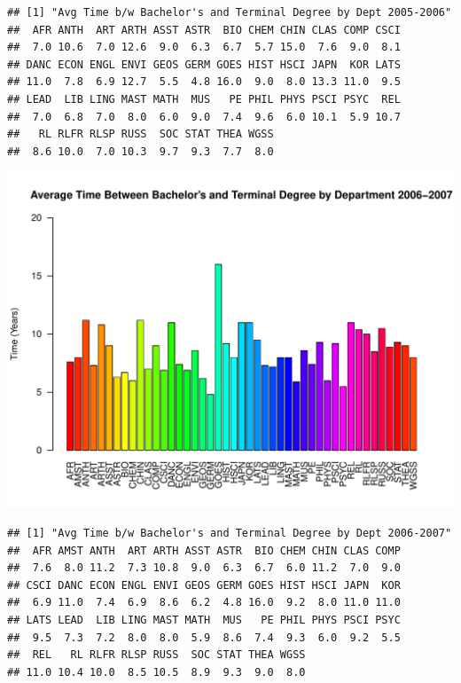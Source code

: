 \documentclass[12pt,a4paper]{article}\usepackage[]{graphicx}\usepackage[]{color}
\makeatletter
\def\maxwidth{ %
  \ifdim\Gin@nat@width>\linewidth
    \linewidth
  \else
    \Gin@nat@width
  \fi
}
\newenvironment{kframe}{%
 \def\at@end@of@kframe{}%
 \ifinner\ifhmode%
  \def\at@end@of@kframe{\end{minipage}}%
  \begin{minipage}{\columnwidth}%
 \fi\fi%
 \def\FrameCommand##1{\hskip\@totalleftmargin \hskip-\fboxsep
 \colorbox{shadecolor}{##1}\hskip-\fboxsep
     \hskip-\linewidth \hskip-\@totalleftmargin \hskip\columnwidth}%
 \MakeFramed {\advance\hsize-\width
   \@totalleftmargin\z@ \linewidth\hsize
   \@setminipage}}%
 {\par\unskip\endMakeFramed%
 \at@end@of@kframe}
\newenvironment{knitrout}{}{} %
\theoremstyle{definition}
\makeatother
\begin{document}
\begin{knitrout}
\begin{kframe}\begin{verbatim}
## [1] "Avg Time b/w Bachelor's and Terminal Degree by Dept 2005-2006"
##  AFR ANTH  ART ARTH ASST ASTR  BIO CHEM CHIN CLAS COMP CSCI 
##  7.0 10.6  7.0 12.6  9.0  6.3  6.7  5.7 15.0  7.6  9.0  8.1 
## DANC ECON ENGL ENVI GEOS GERM GOES HIST HSCI JAPN  KOR LATS 
## 11.0  7.8  6.9 12.7  5.5  4.8 16.0  9.0  8.0 13.3 11.0  9.5 
## LEAD  LIB LING MAST MATH  MUS   PE PHIL PHYS PSCI PSYC  REL 
##  7.0  6.8  7.0  8.0  6.0  9.0  7.4  9.6  6.0 10.1  5.9 10.7 
##   RL RLFR RLSP RUSS  SOC STAT THEA WGSS 
##  8.6 10.0  7.0 10.3  9.7  9.3  7.7  8.0
\end{verbatim}
\end{kframe}
\includegraphics[width=\maxwidth]{figure/unnamed-chunk-13-3} 
\begin{kframe}\begin{verbatim}
## [1] "Avg Time b/w Bachelor's and Terminal Degree by Dept 2006-2007"
##  AFR AMST ANTH  ART ARTH ASST ASTR  BIO CHEM CHIN CLAS COMP 
##  7.6  8.0 11.2  7.3 10.8  9.0  6.3  6.7  6.0 11.2  7.0  9.0 
## CSCI DANC ECON ENGL ENVI GEOS GERM GOES HIST HSCI JAPN  KOR 
##  6.9 11.0  7.4  6.9  8.6  6.2  4.8 16.0  9.2  8.0 11.0 11.0 
## LATS LEAD  LIB LING MAST MATH  MUS   PE PHIL PHYS PSCI PSYC 
##  9.5  7.3  7.2  8.0  8.0  5.9  8.6  7.4  9.3  6.0  9.2  5.5 
##  REL   RL RLFR RLSP RUSS  SOC STAT THEA WGSS 
## 11.0 10.4 10.0  8.5 10.5  8.9  9.3  9.0  8.0
\end{verbatim}
\end{kframe}

\end{knitrout}
\end{document}
